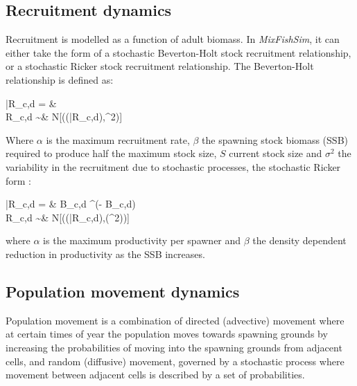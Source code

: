 \documentclass[review]{elsarticle}
\let\oldequation\equation
\let\oldendequation\endequation
\renewenvironment{equation}
 {\linenomathNonumbers\oldequation}
 {\oldendequation\endlinenomath}
\begin{document}
\subsection{Recruitment dynamics}

Recruitment is modelled as a function of adult biomass. In
\textit{MixFishSim}, it can either take the form of a stochastic Beverton-Holt
stock recruitment relationship, or a stochastic Ricker stock recruitment
relationship. The Beverton-Holt relationship is defined as\citep{Beverton1957}: 
\begin{equation}
	\begin{split}
	\bar{R}_{c,d} = &  \\
	     R_{c,d} \sim & \log N[(\log(\bar{R}_{c,d}),\sigma^2)]
	\end{split}
\end{equation}
Where $\alpha$ is the maximum recruitment rate, $\beta$ the spawning stock
biomass (SSB) required to produce half the maximum stock size, $S$ current
stock size and $\sigma^2$ the variability in the recruitment due to stochastic
processes, the stochastic Ricker form \citep{Ricker1954}:
\begin{equation}
	\begin{split}
	\bar{R}_{c,d} = & B_{c,d} \cdot {}^{(\alpha - \beta \cdot B_{c,d})} \\	
   	     R_{c,d} \sim & \log N[(\log(\bar{R}_{c,d}),\log(\sigma^2))]
	\end{split}
\end{equation}
where $\alpha$ is the maximum productivity per spawner and $\beta$ the density
dependent reduction in productivity as the SSB increases. 

\subsection{Population movement dynamics}

Population movement is a combination of directed (advective) movement where at
certain times of year the population moves towards spawning grounds by
increasing the probabilities of moving into the spawning grounds from adjacent
cells, and random (diffusive) movement, governed by a stochastic process where
movement between adjacent cells is described by a set of probabilities.\\
\end{document}
